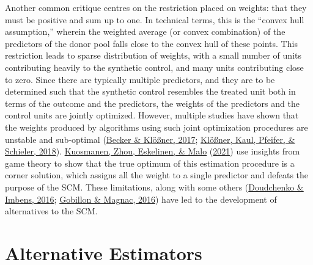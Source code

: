 \documentclass[12pt,nobind, a4paper]{reedthesis}
\begin{document}
 Another common critique centres on the restriction placed on weights: that they must be positive and sum up to one. In technical terms, this is the ``convex hull assumption,'' wherein the weighted average (or convex combination) of the predictors of the donor pool falls close to the convex hull of these points. This restriction leads to sparse distribution of weights, with a small number of units contributing heavily to the synthetic control, and many units contributing close to zero. Since there are typically multiple predictors, and they are to be determined such that the synthetic control resembles the treated unit both in terms of the outcome and the predictors, the weights of the predictors and the control units are jointly optimized. However, multiple studies have shown that the weights produced by algorithms using such joint optimization procedures are unstable and sub-optimal (\protect\hyperlink{ref-becker_estimating_2017}{Becker \& Klößner, 2017}; \protect\hyperlink{ref-klosner_comparative_2018}{Klößner, Kaul, Pfeifer, \& Schieler, 2018}). \protect\hyperlink{ref-kuosmanen_design_2021}{Kuosmanen, Zhou, Eskelinen, \& Malo} (\protect\hyperlink{ref-kuosmanen_design_2021}{2021}) use insights from game theory to show that the true optimum of this estimation procedure is a corner solution, which assigns all the weight to a single predictor and defeats the purpose of the SCM. These limitations, along with some others (\protect\hyperlink{ref-doudchenko_balancing_2016}{Doudchenko \& Imbens, 2016}; \protect\hyperlink{ref-gobillon_regional_2016}{Gobillon \& Magnac, 2016}) have led to the development of alternatives to the SCM.

 \hypertarget{alt}{%
 \section{Alternative Estimators}\label{alt}}
\end{document}
